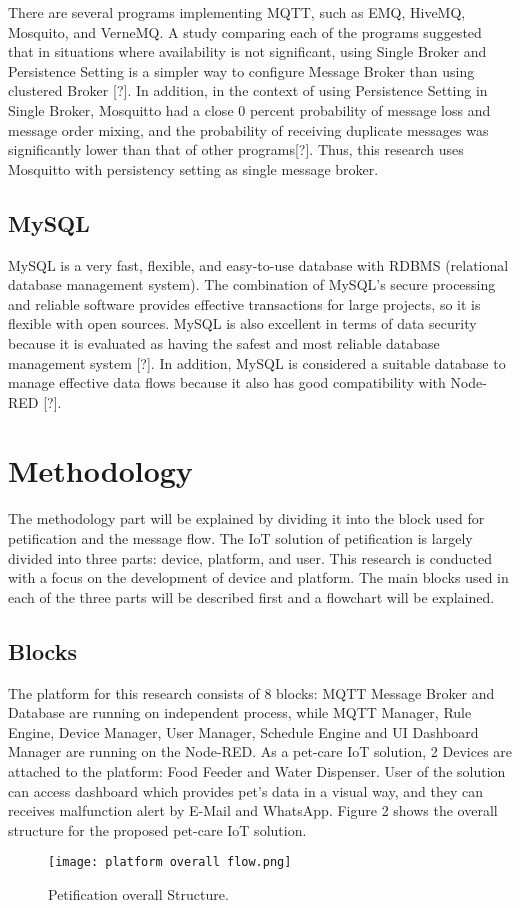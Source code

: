 \documentclass[conference]{IEEEtran}
\begin{document}
There are several programs implementing MQTT, such as EMQ, HiveMQ, Mosquito, and VerneMQ. A study comparing each of the programs suggested that in situations where availability is not significant, using Single Broker and Persistence Setting is a simpler way to configure Message Broker than using clustered Broker [?]. In addition, in the context of using Persistence Setting in Single Broker, Mosquitto had a close 0 percent probability of message loss and message order mixing, and the probability of receiving duplicate messages was significantly lower than that of other programs[?]. Thus, this research uses Mosquitto with persistency setting as single message broker.

\subsection{MySQL}
MySQL is a very fast, flexible, and easy-to-use database with RDBMS (relational database management system). The combination of MySQL's secure processing and reliable software provides effective transactions for large projects, so it is flexible with open sources. MySQL is also excellent in terms of data security because it is evaluated as having the safest and most reliable database management system [?]. In addition, MySQL is considered a suitable database to manage effective data flows because it also has good compatibility with Node-RED [?]. 

\section{Methodology}
The methodology part will be explained by dividing it into the block used for petification and the message flow. The IoT solution of petification is largely divided into three parts: device, platform, and user. This research is conducted with a focus on the development of device and platform. The main blocks used in each of the three parts will be described first and a flowchart will be explained.

\subsection{Blocks}
The platform for this research consists of 8 blocks: MQTT Message Broker and Database are running on independent process, while MQTT Manager, Rule Engine, Device Manager, User Manager, Schedule Engine and UI Dashboard Manager are running on the Node-RED. As a pet-care IoT solution, 2 Devices are attached to the platform: Food Feeder and Water Dispenser. User of the solution can access dashboard which provides pet’s data in a visual way, and they can receives malfunction alert by E-Mail and WhatsApp. Figure 2 shows the overall structure for the proposed pet-care IoT solution.
\begin{figure}[htbp]

\centerline{\texttt{[image: platform overall flow.png]}}
\caption{Petification overall Structure.}
\label{fig}
\end{figure}
\end{document}
